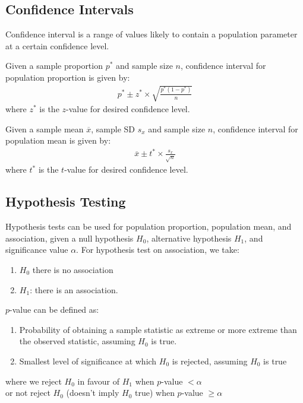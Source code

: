 \documentclass[12pt, a4paper]{article}
\begin{document}
\begin{multicols*}{3}
\subsection{Confidence Intervals}
Confidence interval is a range of values likely to contain a population parameter at a certain confidence level.

Given a sample proportion $p^*$ and sample size $n$, confidence interval for population proportion is given by:
\begin{align*}
  p^* \pm z^* \times \sqrt{\frac{p^*(1-p^*)}{n}}
\end{align*}
where $z^*$ is the $z$-value for desired confidence level.

Given a sample mean $\overline{x}$, sample SD $s_x$ and sample size $n$, confidence interval for population mean is given by:
\begin{align*}
  \overline{x} \pm t^* \times \frac{s_x}{\sqrt{n}}
\end{align*}
where $t^*$ is the $t$-value for desired confidence level.

\subsection{Hypothesis Testing}
Hypothesis tests can be used for population proportion, population mean, and association, given a null hypothesis $H_0$, alternative hypothesis $H_1$, and significance value $\alpha$.
For hypothesis test on association, we take:
\begin{enumerate}[\roman*.]
  \item $H_0$ there is no association
  \item $H_1$: there is an association.  
\end{enumerate}

$p$-value can be defined as:
\begin{enumerate}[\roman*.]
  \item Probability of obtaining a sample statistic as extreme or more extreme than the observed statistic, assuming $H_0$ is true.
  \item Smallest level of significance at which $H_0$ is rejected, assuming $H_0$ is true
\end{enumerate}
where we reject $H_0$ in favour of $H_1$ when $p$-value $< \alpha$\\
or not reject $H_0$ (doesn't imply $H_0$ true) when $p$-value $\geq \alpha$

\end{multicols*}
\end{document}
